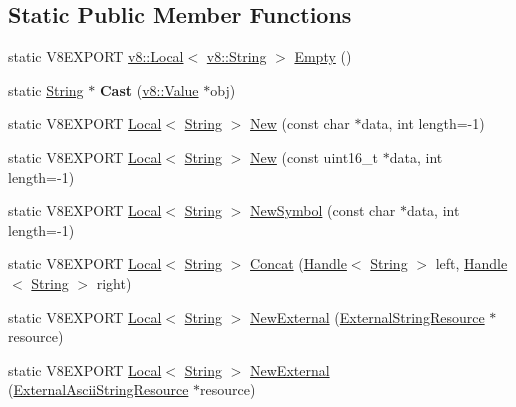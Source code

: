 \subsection*{Static Public Member Functions}
\begin{DoxyCompactItemize}
\item 
static V8\+E\+X\+P\+O\+R\+T \hyperlink{classv8_1_1_local}{v8\+::\+Local}$<$ \hyperlink{classv8_1_1_string}{v8\+::\+String} $>$ \hyperlink{classv8_1_1_string_a148c0f01dca1c477eba42717068a2c7e}{Empty} ()
\item 
\hypertarget{classv8_1_1_string_a826d60798dc152cea64a7636737b03b9}{}static \hyperlink{classv8_1_1_string}{String} $\ast$ {\bfseries Cast} (\hyperlink{classv8_1_1_value}{v8\+::\+Value} $\ast$obj)\label{classv8_1_1_string_a826d60798dc152cea64a7636737b03b9}

\item 
static V8\+E\+X\+P\+O\+R\+T \hyperlink{classv8_1_1_local}{Local}$<$ \hyperlink{classv8_1_1_string}{String} $>$ \hyperlink{classv8_1_1_string_af0f9c44d85056bd575c01e8be7cc1b01}{New} (const char $\ast$data, int length=-\/1)
\item 
static V8\+E\+X\+P\+O\+R\+T \hyperlink{classv8_1_1_local}{Local}$<$ \hyperlink{classv8_1_1_string}{String} $>$ \hyperlink{classv8_1_1_string_a0a2f209db9234477210b8dbf50d50048}{New} (const uint16\+\_\+t $\ast$data, int length=-\/1)
\item 
static V8\+E\+X\+P\+O\+R\+T \hyperlink{classv8_1_1_local}{Local}$<$ \hyperlink{classv8_1_1_string}{String} $>$ \hyperlink{classv8_1_1_string_a496a7a6bb043ae49da105e2648e26c20}{New\+Symbol} (const char $\ast$data, int length=-\/1)
\item 
static V8\+E\+X\+P\+O\+R\+T \hyperlink{classv8_1_1_local}{Local}$<$ \hyperlink{classv8_1_1_string}{String} $>$ \hyperlink{classv8_1_1_string_af21c9d008c6dfc72277b9183d0839940}{Concat} (\hyperlink{classv8_1_1_handle}{Handle}$<$ \hyperlink{classv8_1_1_string}{String} $>$ left, \hyperlink{classv8_1_1_handle}{Handle}$<$ \hyperlink{classv8_1_1_string}{String} $>$ right)
\item 
static V8\+E\+X\+P\+O\+R\+T \hyperlink{classv8_1_1_local}{Local}$<$ \hyperlink{classv8_1_1_string}{String} $>$ \hyperlink{classv8_1_1_string_a4de1bc36a0c6fe52d12726b85d0853f1}{New\+External} (\hyperlink{classv8_1_1_string_1_1_external_string_resource}{External\+String\+Resource} $\ast$resource)
\item 
static V8\+E\+X\+P\+O\+R\+T \hyperlink{classv8_1_1_local}{Local}$<$ \hyperlink{classv8_1_1_string}{String} $>$ \hyperlink{classv8_1_1_string_a07c47bf675b802c550984fa24511a589}{New\+External} (\hyperlink{classv8_1_1_string_1_1_external_ascii_string_resource}{External\+Ascii\+String\+Resource} $\ast$resource)

\end{DoxyCompactItemize}
